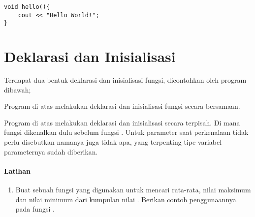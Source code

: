 \documentclass[../main.tex]{subfiles}
\begin{document}
\begin{verbatim}
void hello(){
	cout << "Hello World!";
}
\end{verbatim}

\section{Deklarasi dan Inisialisasi}
Terdapat dua bentuk deklarasi dan inisialisasi fungsi, dicontohkan oleh program
dibawah;


Program di atas melakukan deklarasi dan inisialisasi fungsi secara bersamaan.


Program di atas melakukan deklarasi dan inisialisasi secara terpisah. Di mana
fungsi dikenalkan dulu sebelum fungsi . Untuk parameter saat
perkenalaan tidak perlu disebutkan namanya juga tidak apa, yang terpenting tipe
variabel parameternya sudah diberikan.

\paragraph{Latihan}
\begin{enumerate}
	\item Buat sebuah fungsi yang digunakan untuk mencari rata-rata, nilai
	maksimum dan nilai minimum dari kumpulan nilai . Berikan
	contoh penggunaannya pada fungsi .
\end{enumerate}
\end{document}
